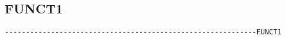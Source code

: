 
\subsection{FUNCT1}
\begin{verbatim}
------------------------------------------------------------FUNCT1
\end{verbatim}


